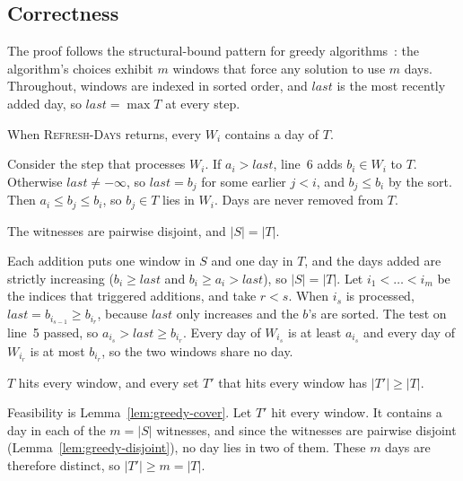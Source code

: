 \subsection{Correctness}
\label{sec:greedy-correctness}

The proof follows the structural-bound pattern for greedy
algorithms~\cite{kleinberg2006algorithm}: the algorithm's choices exhibit
$m$ windows that force any solution to use $m$ days. Throughout, windows are
indexed in sorted order, and $\mathit{last}$ is the most recently added day,
so $\mathit{last}=\max T$ at every step.

\begin{lemma}\label{lem:greedy-cover}
When \textsc{Refresh-Days} returns, every $W_i$ contains a day of $T$.
\end{lemma}
\begin{IEEEproof}
Consider the step that processes $W_i$. If $a_i>\mathit{last}$, line~6 adds
$b_i\in W_i$ to $T$. Otherwise $\mathit{last}\ne-\infty$, so
$\mathit{last}=b_j$ for some earlier $j<i$, and $b_j\le b_i$ by the sort.
Then $a_i\le b_j\le b_i$, so $b_j\in T$ lies in $W_i$. Days are never removed
from $T$.
\end{IEEEproof}

\begin{lemma}\label{lem:greedy-disjoint}
The witnesses are pairwise disjoint, and $|S|=|T|$.
\end{lemma}
\begin{IEEEproof}
Each addition puts one window in $S$ and one day in $T$, and the days added
are strictly increasing ($b_i\ge\mathit{last}$ and $b_i\ge a_i>\mathit{last}$),
so $|S|=|T|$. Let $i_1<\dots<i_m$ be the indices that triggered additions,
and take $r<s$. When $i_s$ is processed, $\mathit{last}=b_{i_{s-1}}\ge
b_{i_r}$, because $\mathit{last}$ only increases and the $b$'s are sorted.
The test on line~5 passed, so $a_{i_s}>\mathit{last}\ge b_{i_r}$. Every day
of $W_{i_s}$ is at least $a_{i_s}$ and every day of $W_{i_r}$ is at most
$b_{i_r}$, so the two windows share no day.
\end{IEEEproof}

\begin{theorem}[optimality]\label{thm:greedy-opt}
$T$ hits every window, and every set $T'$ that hits every window has
$|T'|\ge|T|$.
\end{theorem}
\begin{IEEEproof}
Feasibility is Lemma~\ref{lem:greedy-cover}. Let $T'$ hit every window. It
contains a day in each of the $m=|S|$ witnesses, and since the witnesses are
pairwise disjoint (Lemma~\ref{lem:greedy-disjoint}), no day lies in two of
them. These $m$ days are therefore distinct, so $|T'|\ge m=|T|$.
\end{IEEEproof}

